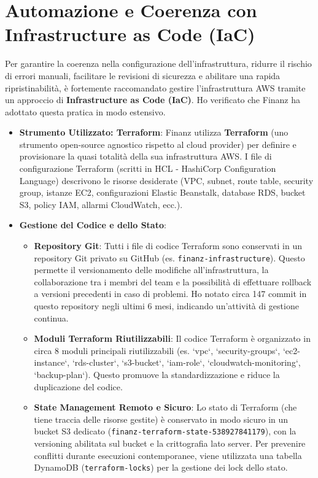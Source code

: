 \section{Automazione e Coerenza con Infrastructure as Code (IaC)}
\label{sec:iac_cap2}
Per garantire la coerenza nella configurazione dell'infrastruttura, ridurre il rischio di errori manuali, facilitare le revisioni di sicurezza e abilitare una rapida ripristinabilità, è fortemente raccomandato gestire l'infrastruttura AWS tramite un approccio di \textbf{Infrastructure as Code (IaC)}. Ho verificato che Finanz ha adottato questa pratica in modo estensivo.
\begin{itemize}
    \item \textbf{Strumento Utilizzato: Terraform}: Finanz utilizza \textbf{Terraform} (uno strumento open-source agnostico rispetto al cloud provider) per definire e provisionare la quasi totalità della sua infrastruttura AWS. I file di configurazione Terraform (scritti in HCL - HashiCorp Configuration Language) descrivono le risorse desiderate (VPC, subnet, route table, security group, istanze EC2, configurazioni Elastic Beanstalk, database RDS, bucket S3, policy IAM, allarmi CloudWatch, ecc.).
    \item \textbf{Gestione del Codice e dello Stato}:
        \begin{itemize}
            \item \textbf{Repository Git}: Tutti i file di codice Terraform sono conservati in un repository Git privato su GitHub (es. \texttt{finanz-infrastructure}). Questo permette il versionamento delle modifiche all'infrastruttura, la collaborazione tra i membri del team e la possibilità di effettuare rollback a versioni precedenti in caso di problemi. Ho notato circa 147 commit in questo repository negli ultimi 6 mesi, indicando un'attività di gestione continua.
            \item \textbf{Moduli Terraform Riutilizzabili}: Il codice Terraform è organizzato in circa 8 moduli principali riutilizzabili (es. `vpc`, `security-groups`, `ec2-instance`, `rds-cluster`, `s3-bucket`, `iam-role`, `cloudwatch-monitoring`, `backup-plan`). Questo promuove la standardizzazione e riduce la duplicazione del codice.
            \item \textbf{State Management Remoto e Sicuro}: Lo stato di Terraform (che tiene traccia delle risorse gestite) è conservato in modo sicuro in un bucket S3 dedicato (\texttt{finanz-terraform-state-538927841179}), con la versioning abilitata sul bucket e la crittografia lato server. Per prevenire conflitti durante esecuzioni contemporanee, viene utilizzata una tabella DynamoDB (\texttt{terraform-locks}) per la gestione dei lock dello stato.

\end{itemize}
\end{itemize}

